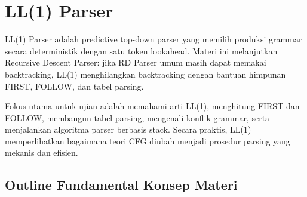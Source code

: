 \section{LL(1) Parser}

LL(1) Parser adalah predictive top-down parser yang memilih produksi grammar secara deterministik dengan satu token lookahead. Materi ini melanjutkan Recursive Descent Parser: jika RD Parser umum masih dapat memakai backtracking, LL(1) menghilangkan backtracking dengan bantuan himpunan FIRST, FOLLOW, dan tabel parsing.

Fokus utama untuk ujian adalah memahami arti LL(1), menghitung FIRST dan FOLLOW, membangun tabel parsing, mengenali konflik grammar, serta menjalankan algoritma parser berbasis stack. Secara praktis, LL(1) memperlihatkan bagaimana teori CFG diubah menjadi prosedur parsing yang mekanis dan efisien.

\subsection{Outline Fundamental Konsep Materi}

